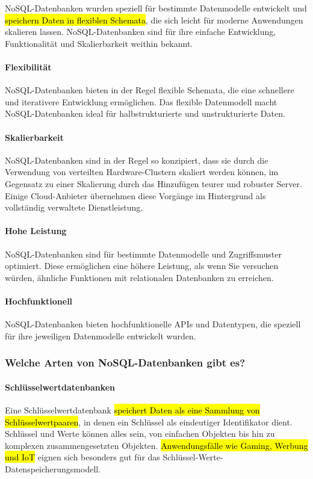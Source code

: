NoSQL-Datenbanken wurden speziell für bestimmte Datenmodelle entwickelt und \hl{speichern Daten in flexiblen Schemata}, die sich leicht für moderne Anwendungen skalieren lassen. NoSQL-Datenbanken sind für ihre einfache Entwicklung, Funktionalität und Skalierbarkeit weithin bekannt. \cite{AWSnoSQL}

\paragraph{Flexibilität} NoSQL-Datenbanken bieten in der Regel flexible Schemata, die eine schnellere und iterativere Entwicklung ermöglichen. Das flexible Datenmodell macht NoSQL-Datenbanken ideal für halbstrukturierte und unstrukturierte Daten.

\paragraph{Skalierbarkeit} NoSQL-Datenbanken sind in der Regel so konzipiert, dass sie durch die Verwendung von verteilten Hardware-Clustern skaliert werden können, im Gegensatz zu einer Skalierung durch das Hinzufügen teurer und robuster Server. Einige Cloud-Anbieter übernehmen diese Vorgänge im Hintergrund als vollständig verwaltete Dienstleistung.

\paragraph{Hohe Leistung} NoSQL-Datenbanken sind für bestimmte Datenmodelle und Zugriffsmuster optimiert. Diese ermöglichen eine höhere Leistung, als wenn Sie versuchen würden, ähnliche Funktionen mit relationalen Datenbanken zu erreichen.

\paragraph{Hochfunktionell} NoSQL-Datenbanken bieten hochfunktionelle APIs und Datentypen, die speziell für ihre jeweiligen Datenmodelle entwickelt wurden.

\subsubsection{Welche Arten von NoSQL-Datenbanken gibt es?}
\label{sec:ArtenNoSQL}

\paragraph{Schlüsselwertdatenbanken} Eine Schlüsselwertdatenbank \hl{speichert Daten als eine Sammlung von Schlüsselwertpaaren}, in denen ein Schlüssel als eindeutiger Identifikator dient. Schlüssel und Werte können alles sein, von einfachen Objekten bis hin zu komplexen zusammengesetzten Objekten. \hl{Anwendungsfälle wie Gaming, Werbung und IoT} eignen sich besonders gut für das Schlüssel-Werte-Datenspeicherungsmodell. 

